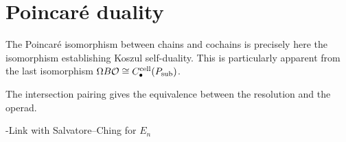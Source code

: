 
\section{Poincar\'e duality} 
\label{s:poincare}


The Poincar\'e isomorphism between chains and cochains is precisely here the isomorphism establishing Koszul self-duality. This is particularly apparent from the last isomorphism $\Omega B \mathcal{O} \cong C_{\bullet}^{\mathrm{cell}}(P_\mathrm{sub})$.

The intersection pairing gives the equivalence between the resolution and the operad. 

-Link with Salvatore--Ching for $E_n$

